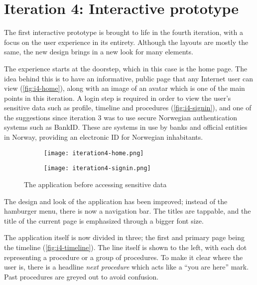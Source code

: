 \section{Iteration 4: Interactive prototype}
\label{sec:iteration4}

The first interactive prototype is brought to life in the fourth iteration, with a focus on the user experience in its entirety. Although the layouts are mostly the same, the new design brings in a new look for many elements.

The experience starts at the doorstep, which in this case is the home page. The idea behind this is to have an informative, public page that any Internet user can view (\autoref{fig:i4-home}), along with an image of an avatar which is one of the main points in this iteration. A login step is required in order to view the user's sensitive data such as profile, timeline and procedures (\autoref{fig:i4-signin}), and one of the suggestions since iteration 3 was to use secure Norwegian authentication systems such as BankID. These are systems in use by banks and official entities in Norway, providing an electronic ID for Norwegian inhabitants.

\begin{figure}
    \centering
    \begin{subfigure}{0.45\textwidth}
        \centering
        \texttt{[image: iteration4-home.png]}
        \label{fig:i4-home}
    \end{subfigure}
    \begin{subfigure}{0.45\textwidth}
        \centering
        \texttt{[image: iteration4-signin.png]}
        \label{fig:i4-signin}
    \end{subfigure}
    \caption{The application before accessing sensitive data}
    \label{fig:i4-welcome}
\end{figure}

The design and look of the application has been improved; instead of the hamburger menu, there is now a navigation bar. The titles are tappable, and the title of the current page is emphasized through a bigger font size.

The application itself is now divided in three; the first and primary page being the timeline (\autoref{fig:i4-timeline}). The line itself is shown to the left, with each dot representing a procedure or a group of procedures. To make it clear where the user is, there is a headline \emph{next procedure} which acts like a \enquote{you are here} mark. Past procedures are greyed out to avoid confusion.

